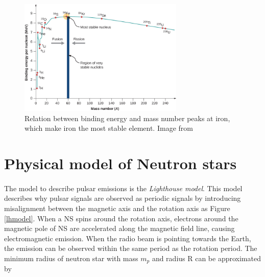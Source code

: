 \documentclass[thesis_msc.tex]{subfiles}
\begin{document}
    \begin{figure}[htbp] \centering
\includegraphics[width=0.70\textwidth]{figures/binding.jpg}
\caption{Relation between binding energy and mass number peaks at iron, which make iron the most stable element. Image from \cite{urone_hinrichs_dirks_sharma_2018} } %

\label{binding}
\end{figure}

\section{Physical model of Neutron stars} \label{phys}
    \paragraph{} The model to describe pulsar emissions is  the \textit{Lighthouse model}. This model describes why pulsar signals are observed as periodic signals by introducing misalignment between the magnetic axis and the rotation axis as Figure \ref{lhmodel}. When a NS spins around the rotation axis, electrons around the magnetic pole of NS are accelerated along the magnetic field line, causing electromagnetic emission. %
    When the radio beam is pointing towards the Earth, the emission can be observed within the same period as the rotation period. The minimum radius of neutron star with mass $m_p$ and radius R  can be approximated by 
\end{document}
